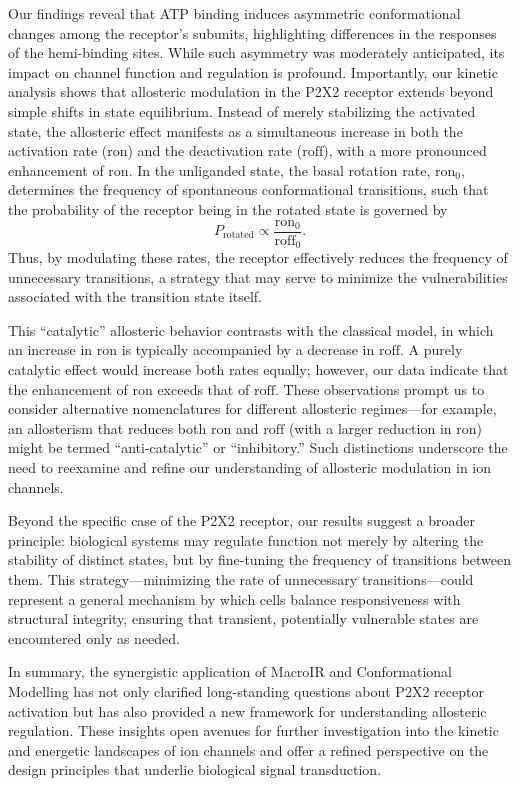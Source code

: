 \documentclass[a4paper,12pt]{article}
\begin{document}
	Our findings reveal that ATP binding induces asymmetric conformational changes among the receptor’s subunits, highlighting differences in the responses of the hemi-binding sites. While such asymmetry was moderately anticipated, its impact on channel function and regulation is profound. Importantly, our kinetic analysis shows that allosteric modulation in the P2X2 receptor extends beyond simple shifts in state equilibrium. Instead of merely stabilizing the activated state, the allosteric effect manifests as a simultaneous increase in both the activation rate ($\mathrm{ron}$) and the deactivation rate ($\mathrm{roff}$), with a more pronounced enhancement of $\mathrm{ron}$. In the unliganded state, the basal rotation rate, $\mathrm{ron}_0$, determines the frequency of spontaneous conformational transitions, such that the probability of the receptor being in the rotated state is governed by
	\[
	P_{\text{rotated}} \propto \frac{\mathrm{ron}_0}{\mathrm{roff}_0}.
	\]
	Thus, by modulating these rates, the receptor effectively reduces the frequency of unnecessary transitions, a strategy that may serve to minimize the vulnerabilities associated with the transition state itself.
	
	This “catalytic” allosteric behavior contrasts with the classical model, in which an increase in $\mathrm{ron}$ is typically accompanied by a decrease in $\mathrm{roff}$. A purely catalytic effect would increase both rates equally; however, our data indicate that the enhancement of $\mathrm{ron}$ exceeds that of $\mathrm{roff}$. These observations prompt us to consider alternative nomenclatures for different allosteric regimes—for example, an allosterism that reduces both $\mathrm{ron}$ and $\mathrm{roff}$ (with a larger reduction in $\mathrm{ron}$) might be termed “anti-catalytic” or “inhibitory.” Such distinctions underscore the need to reexamine and refine our understanding of allosteric modulation in ion channels.
	
	Beyond the specific case of the P2X2 receptor, our results suggest a broader principle: biological systems may regulate function not merely by altering the stability of distinct states, but by fine-tuning the frequency of transitions between them. This strategy—minimizing the rate of unnecessary transitions—could represent a general mechanism by which cells balance responsiveness with structural integrity, ensuring that transient, potentially vulnerable states are encountered only as needed.
	
	In summary, the synergistic application of MacroIR and Conformational Modelling has not only clarified long-standing questions about P2X2 receptor activation but has also provided a new framework for understanding allosteric regulation. These insights open avenues for further investigation into the kinetic and energetic landscapes of ion channels and offer a refined perspective on the design principles that underlie biological signal transduction.
	
\end{document}
